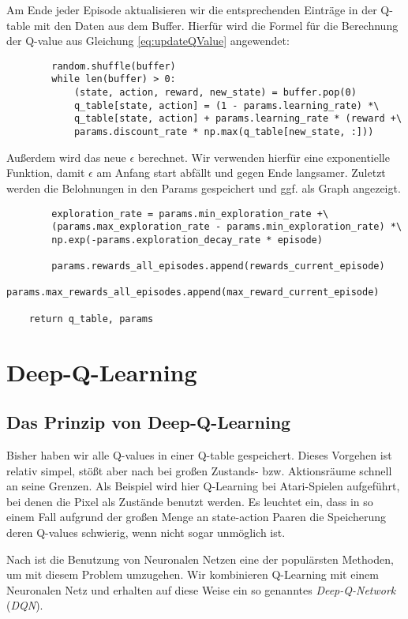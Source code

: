 Am Ende jeder Episode aktualisieren wir die entsprechenden Einträge in der Q-table mit den Daten aus dem Buffer. Hierfür wird die Formel für die Berechnung der Q-value aus Gleichung \ref{eq:updateQValue} angewendet:
\begin{verbatim}
        random.shuffle(buffer)
        while len(buffer) > 0:
            (state, action, reward, new_state) = buffer.pop(0)
            q_table[state, action] = (1 - params.learning_rate) *\
            q_table[state, action] + params.learning_rate * (reward +\
            params.discount_rate * np.max(q_table[new_state, :]))
\end{verbatim}

Außerdem wird das neue $ \epsilon $ berechnet. Wir verwenden hierfür eine exponentielle Funktion, damit $ \epsilon $ am Anfang start abfällt und gegen Ende langsamer. Zuletzt werden die Belohnungen in den Params gespeichert und ggf. als Graph angezeigt.
\begin{verbatim}
        exploration_rate = params.min_exploration_rate +\
        (params.max_exploration_rate - params.min_exploration_rate) *\
        np.exp(-params.exploration_decay_rate * episode)

        params.rewards_all_episodes.append(rewards_current_episode)
        params.max_rewards_all_episodes.append(max_reward_current_episode)

    return q_table, params
\end{verbatim}


\section{Deep-Q-Learning}
\subsection{Das Prinzip von Deep-Q-Learning} \label{sec:deepQPrinciple}
Bisher haben wir alle Q-values in einer Q-table gespeichert. Dieses Vorgehen ist relativ simpel, stößt aber nach \cite{11_maxim2018deeprl} bei großen Zustands- bzw. Aktionsräume schnell an seine Grenzen. Als Beispiel wird hier Q-Learning bei Atari-Spielen aufgeführt, bei denen die Pixel als Zustände benutzt werden. Es leuchtet ein, dass in so einem Fall aufgrund der großen Menge an state-action Paaren die Speicherung deren Q-values schwierig, wenn nicht sogar unmöglich ist.

Nach \cite{11_maxim2018deeprl} ist die Benutzung von Neuronalen Netzen eine der populärsten Methoden, um mit diesem Problem umzugehen. Wir kombinieren Q-Learning mit einem Neuronalen Netz und erhalten auf diese Weise ein so genanntes \textit{Deep-Q-Network} (\textit{DQN}).

